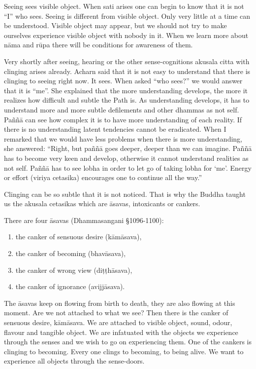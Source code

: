 Seeing sees visible object. When sati arises one can begin to know that
it is not ``I'' who sees. Seeing is different from visible object. Only
very little at a time can be understood. Visible object may appear, but
we should not try to make ourselves experience visible object with
nobody in it. When we learn more about nāma and rūpa there will be
conditions for awareness of them.

Very shortly after seeing, hearing or the other sense-cognitions akusala
citta with clinging arises already. Acharn said that it is not easy to
understand that there is clinging to seeing right now. It sees. When
asked ``who sees?'' we would answer that it is ``me''. She explained
that the more understanding develops, the more it realizes how difficult
and subtle the Path is. As understanding develops, it has to understand
more and more subtle defilements and other dhammas as not self. Paññā
can see how complex it is to have more understanding of each reality. If
there is no understanding latent tendencies cannot be eradicated. When I
remarked that we would have less problems when there is more
understanding, she answered: ``Right, but paññā goes deeper, deeper than
we can imagine. Paññā has to become very keen and develop, otherwise it
cannot understand realities as not self. Paññā has to see lobha in order
to let go of taking lobha for `me'. Energy or effort (viriya cetasika)
encourages one to continue all the way.''

Clinging can be so subtle that it is not noticed. That is why the Buddha
taught us the akusala cetasikas which are āsavas, intoxicants or
cankers.

There are four āsavas (Dhammasangani §1096-1100):

\begin{enumerate}


\item the canker of sensuous desire (kāmāsava),

\item  the canker of becoming (bhavāsava),

\item the canker of wrong view (diṭṭhāsava),

\item the canker of ignorance (avijjāsava).

\end{enumerate}

The āsavas keep on flowing from birth to death, they are also flowing at
this moment. Are we not attached to what we see? Then there is the
canker of sensuous desire, kāmāsava. We are attached to visible object,
sound, odour, flavour and tangible object. We are infatuated with the
objects we experience through the senses and we wish to go on
experiencing them. One of the cankers is clinging to becoming. Every one
clings to becoming, to being alive. We want to experience all objects
through the sense-doors.


